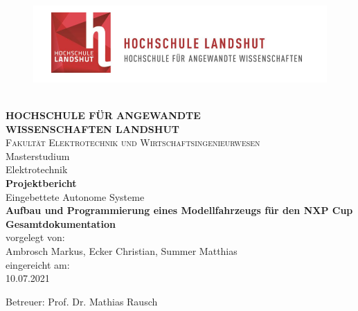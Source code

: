 
\begin{titlepage}
\begin{center}

\begin{figure}[H]
\includegraphics[width=15cm]{titlepage/images/Logo_HAW_Landshut} 
\end{figure}\textnormal{ }\\[0.1cm]

\textbf{\large{HOCHSCHULE FÜR ANGEWANDTE\\[0.5cm] WISSENSCHAFTEN LANDSHUT}}\\[1.0cm]
\textsc{\large {Fakultät Elektrotechnik und Wirtschaftsingenieurwesen}}\\[1.0cm]
\textnormal{{Masterstudium}}\\[0.5cm]
\textnormal{{Elektrotechnik}}\\[1.0cm]

\Large\textbf{Projektbericht}\\[0.5cm]
\large{Eingebettete Autonome Systeme}\\[0.5cm]

\large\textbf {Aufbau und Programmierung eines Modellfahrzeugs
für den NXP Cup Gesamtdokumentation}\\[1.5cm]

\small\textnormal{vorgelegt von:}\\[0.3cm]
\textnormal{Ambrosch Markus, Ecker Christian, Summer Matthias}\\[0.3cm]
\textnormal eingereicht am:\\[0.3cm]
\textnormal{10.07.2021}

\vfill

\textnormal{Betreuer: Prof. Dr. Mathias Rausch} 

\end{center}
\end{titlepage}
\newpage